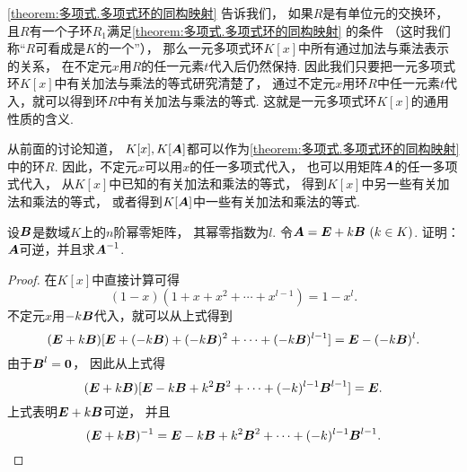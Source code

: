 \cref{theorem:多项式.多项式环的同构映射} 告诉我们，
如果\(R\)是有单位元的交换环，
且\(R\)有一个子环\(R_1\)满足\cref{theorem:多项式.多项式环的同构映射} 的条件
（这时我们称“\(R\)可看成是\(K\)的一个”），
那么一元多项式环\(K[x]\)中所有通过加法与乘法表示的关系，
在不定元\(x\)用\(R\)的任一元素\(t\)代入后仍然保持.
因此我们只要把一元多项式环\(K[x]\)中有关加法与乘法的等式研究清楚了，
通过不定元\(x\)用环\(R\)中任一元素\(t\)代入，就可以得到环\(R\)中有关加法与乘法的等式.
这就是一元多项式环\(K[x]\)的通用性质的含义.

从前面的讨论知道，
\(K[x],K[\boldsymbol{A}]\)都可以作为\cref{theorem:多项式.多项式环的同构映射} 中的环\(R\).
因此，不定元\(x\)可以用\(x\)的任一多项式代入，
也可以用矩阵\(\boldsymbol{A}\)的任一多项式代入，
从\(K[x]\)中已知的有关加法和乘法的等式，
得到\(K[x]\)中另一些有关加法和乘法的等式，
或者得到\(K[\boldsymbol{A}]\)中一些有关加法和乘法的等式.

\begin{example}
设\(\boldsymbol{B}\)是数域\(K\)上的\(n\)阶幂零矩阵，
其幂零指数为\(l\).
令\(\boldsymbol{A}=\boldsymbol{E}+k\boldsymbol{B}\ (k \in K)\).
证明：\(\boldsymbol{A}\)可逆，并且求\(\boldsymbol{A}^{-1}\).
\begin{proof}
在\(K[x]\)中直接计算可得\[
	(1-x)(1+x+x^2+\dotsb+x^{l-1})
	=1-x^l.
\]
不定元\(x\)用\(-k\boldsymbol{B}\)代入，就可以从上式得到\[
	(\boldsymbol{E}+k\boldsymbol{B})[\boldsymbol{E}+(-k\boldsymbol{B})+(-k\boldsymbol{B})^2+\dotsb+(-k\boldsymbol{B})^{l-1}]
	=\boldsymbol{E}-(-k\boldsymbol{B})^l.
\]
由于\(\boldsymbol{B}^l=\boldsymbol0\)，
因此从上式得\[
	(\boldsymbol{E}+k\boldsymbol{B})[\boldsymbol{E}-k\boldsymbol{B}+k^2\boldsymbol{B}^2+\dotsb+(-k)^{l-1}\boldsymbol{B}^{l-1}]
	=\boldsymbol{E}.
\]
上式表明\(\boldsymbol{E}+k\boldsymbol{B}\)可逆，
并且\[
	(\boldsymbol{E}+k\boldsymbol{B})^{-1}
	= \boldsymbol{E}-k\boldsymbol{B}+k^2\boldsymbol{B}^2+\dotsb+(-k)^{l-1}\boldsymbol{B}^{l-1}.
	\qedhere
\]
\end{proof}
\end{example}
